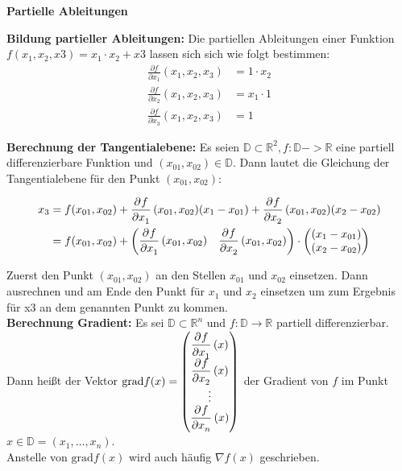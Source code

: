 \documentclass[fontset=ubuntu,12pt,a4paper,fleqn]{article}
\begin{document}
{\Large\textbf{Partielle Ableitungen}\par}

\textbf{Bildung partieller Ableitungen:}
Die partiellen Ableitungen einer Funktion $f(x_1,x_2,x3)= x_1\cdot x_2+x3$ lassen sich sich wie folgt bestimmen:
\begin{align*}
\frac{\partial f}{\partial x_1}(x_1,x_2,x_3) &= 1\cdot x_2\\
\frac{\partial f}{\partial x_2}(x_1,x_2,x_3) &= x_1\cdot 1\\
\frac{\partial f}{\partial x_3}(x_1,x_2,x_3) &= 1
\end{align*}

\textbf{Berechnung der Tangentialebene:}
Es seien \(\mathbb{D} \subset \mathbb{R}^2, f:\mathbb{D}->\mathbb{R}\) eine partiell differenzierbare Funktion und \((x_{01},x_{02})\in\mathbb{D}\). Dann lautet die Gleichung der Tangentialebene für den Punkt \((x_{01},x_{02})\):

\begin{align*}
x_3&=f(x_{01},x_{02})+\dpd{f}{x_1}(x_{01},x_{02})(x_1-x_{01})+\dpd{f}{x_2}(x_{01},x_{02})(x_2-x_{02})\\
&=f(x_{01},x_{02})+\begin{pmatrix} \dpd{f}{x_1} (x_{01},x_{02}) & \dpd{f}{x_2}(x_{01},x_{02}) \end{pmatrix} \cdot \begin{pmatrix} (x_1-x_{01})\\ (x_2-x_{02}) \end{pmatrix}
\end{align*}

Zuerst den Punkt $(x_{01},x_{02})$ an den Stellen $x_{01}$ und $x_{02}$ einsetzen. Dann ausrechnen und am Ende den Punkt für  $x_{1}$ und $x_{2}$ einsetzen um zum Ergebnis für x3 an dem genannten Punkt zu kommen.\\

\textbf{Berechnung Gradient:}
Es sei \(\mathbb{D} \subset \mathbb{R}^n\) und \(f:\mathbb{D} \to \mathbb{R}\) partiell differenzierbar. Dann heißt der Vektor \(\mathrm{grad} f(x) = \begin{pmatrix}
\dpd{f}{x_1}(x) \\
\dpd{f}{x_2}(x) \\
\vdots \\
\dpd{f}{x_n}(x) \\
\end{pmatrix}\) der Gradient von \(f\) im Punkt \(x\in\mathbb{D}= (x_1,\dots,x_n)\).\\Anstelle von \(\mathrm{grad} f(x)\) wird auch häufig \(\nabla f(x)\) geschrieben.\\
\end{document}
